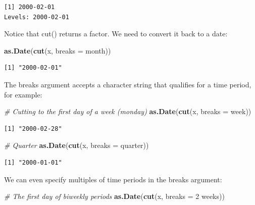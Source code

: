 \documentclass[
]{book}
\newenvironment{Shaded}{\begin{snugshade}}{\end{snugshade}}
\newcommand{\AttributeTok}[1]{\textcolor[rgb]{0.13,0.29,0.53}{#1}}
\newcommand{\CommentTok}[1]{\textcolor[rgb]{0.56,0.35,0.01}{\textit{#1}}}
\newcommand{\FunctionTok}[1]{\textcolor[rgb]{0.13,0.29,0.53}{\textbf{#1}}}
\newcommand{\NormalTok}[1]{#1}
\newcommand{\StringTok}[1]{\textcolor[rgb]{0.31,0.60,0.02}{#1}}
\begin{document}
\begin{verbatim}
[1] 2000-02-01
Levels: 2000-02-01
\end{verbatim}

Notice that cut() returns a factor. We need to convert it back to a
date:

\begin{Shaded}
\begin{Highlighting}[]
\FunctionTok{as.Date}\NormalTok{(}\FunctionTok{cut}\NormalTok{(x, }\AttributeTok{breaks =} \StringTok{\textquotesingle{}month\textquotesingle{}}\NormalTok{))}
\end{Highlighting}
\end{Shaded}

\begin{verbatim}
[1] "2000-02-01"
\end{verbatim}

The breaks argument accepts a character string that qualifies for a time
period, for example:

\begin{Shaded}
\begin{Highlighting}[]
\CommentTok{\# Cutting to the first day of a week (monday)}
\FunctionTok{as.Date}\NormalTok{(}\FunctionTok{cut}\NormalTok{(x, }\AttributeTok{breaks =} \StringTok{\textquotesingle{}week\textquotesingle{}}\NormalTok{))}
\end{Highlighting}
\end{Shaded}

\begin{verbatim}
[1] "2000-02-28"
\end{verbatim}

\begin{Shaded}
\begin{Highlighting}[]
\CommentTok{\# Quarter}
\FunctionTok{as.Date}\NormalTok{(}\FunctionTok{cut}\NormalTok{(x, }\AttributeTok{breaks =} \StringTok{\textquotesingle{}quarter\textquotesingle{}}\NormalTok{))}
\end{Highlighting}
\end{Shaded}

\begin{verbatim}
[1] "2000-01-01"
\end{verbatim}

We can even specify multiples of time periods in the breaks argument:

\begin{Shaded}
\begin{Highlighting}[]
\CommentTok{\# The first day of biweekly periods}
\FunctionTok{as.Date}\NormalTok{(}\FunctionTok{cut}\NormalTok{(x, }\AttributeTok{breaks =} \StringTok{\textquotesingle{}2 weeks\textquotesingle{}}\NormalTok{))}
\end{Highlighting}
\end{Shaded}
\end{document}
